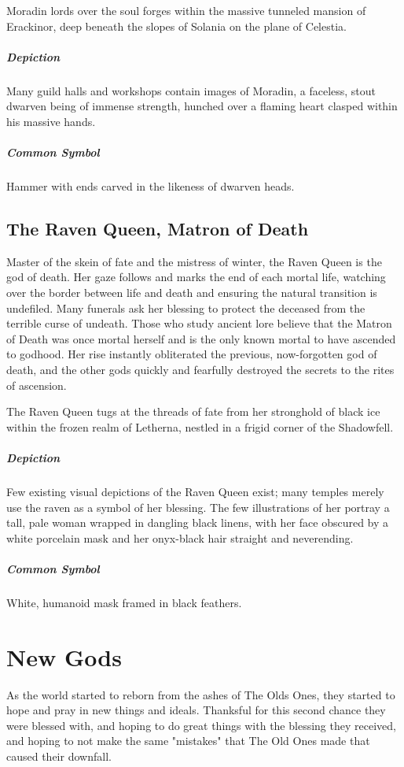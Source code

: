 \documentclass[letterpaper, twocolumn, openany, nodeprecatedcode, layout=true]{dndbook}
\begin{document}
Moradin lords over the soul forges within the massive tunneled mansion of Erackinor,
deep beneath the slopes of Solania on the plane of Celestia.

\subparagraph{Depiction}
Many guild halls and workshops contain images of Moradin, a faceless, stout dwarven
being of immense strength, hunched over a flaming heart clasped within his massive hands.

\subparagraph{Common Symbol}
Hammer with ends carved in the likeness of dwarven heads.

\subsection{The Raven Queen, Matron of Death}

Master of the skein of fate and the mistress of winter, the Raven Queen is the god of
death. Her gaze follows and marks the end of each mortal life, watching over the border
between life and death and ensuring the natural transition is undefiled. Many funerals
ask her blessing to protect the deceased from the terrible curse of undeath. Those who
study ancient lore believe that the Matron of Death was once mortal herself and is the
only known mortal to have ascended to godhood. Her rise instantly obliterated the previous,
now-forgotten god of death, and the other gods quickly and fearfully destroyed the secrets
to the rites of ascension.

The Raven Queen tugs at the threads of fate from her stronghold of black ice within the
frozen realm of Letherna, nestled in a frigid corner of the Shadowfell.

\subparagraph{Depiction}
Few existing visual depictions of the Raven Queen exist; many temples merely use the
raven as a symbol of her blessing. The few illustrations of her portray a tall, pale
woman wrapped in dangling black linens, with her face obscured by a white porcelain
mask and her onyx-black hair straight and neverending.

\subparagraph{Common Symbol}
White, humanoid mask framed in black feathers.

\section{New Gods}

As the world started to reborn from the ashes of The Olds Ones, they started to hope and
pray in new things and ideals. Thanksful for this second chance they were blessed with,
and hoping to do great things with the blessing they received, and hoping to not make
the same "mistakes" that The Old Ones made that caused their downfall.
\end{document}

